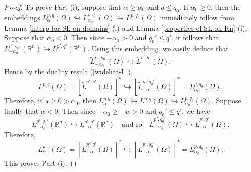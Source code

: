 \documentclass[10pt,a4paper]{amsart}
\newcommand{\R}{{\mathbb{R}}}
\begin{document}
\begin{proof} To prove Part (i), suppose that $\alpha  \ge \alpha_0$  and $q \le q_0 $. If $\alpha_0 \ge 0$, then the embeddings   $ L_\alpha^{p,q}(\Omega )  \hookrightarrow    L_{\alpha_0}^{p,q_0 }(\Omega )\hookrightarrow    L^{p,q_0 }(\Omega )$  immediately follow    from Lemma \ref{interp for SL on domains} (i) and Lemma \ref{properties of SL on Rn} (i).
Suppose that $\alpha_0 < 0$. Then since $-\alpha_0 >  0$ and $q_0 '\le q'$, it follows that  $ L_{-\alpha_0}^{p',q_0'}(\R^n )  \hookrightarrow    L^{p',q '}(\R^n ) $. Using this embedding, we easily deduce that
$$
\widetilde{L}_{-\alpha_0}^{p',q_0 '}(\Omega )     \hookrightarrow  \widetilde{L}^{p',q'}(\Omega ).
$$
Hence by the duality result  (\ref{widehat-L}),
\[
L^{p,q}(\Omega )  = \left[ \widetilde{L}^{p',q'}(\Omega ) \right]^* \hookrightarrow \left[ \widetilde{L}_{-\alpha_0}^{p',q_0 '}(\Omega ) \right]^* = L_{\alpha_0}^{p,q_0 }(\Omega )   .
\]
Therefore, if $\alpha \ge 0 > \alpha_0$, then
$L_{\alpha}^{p,q  }(\Omega ) \hookrightarrow  L^{p,q}(\Omega )   \hookrightarrow L_{\alpha_0}^{p,q_0 }(\Omega )$.
Suppose finally that $\alpha < 0$.  Then since $-\alpha_0 \ge -\alpha > 0$ and $q_0 '\le q'$, we have
$$
L_{-\alpha_0}^{p',q_0'}(\R^n )  \hookrightarrow    L_{-\alpha}^{p',q '}(\R^n )
\quad\mbox{and so}\quad
\widetilde{L}_{-\alpha_0}^{p',q_0 '}(\Omega )  \hookrightarrow  \widetilde{L}_{-\alpha}^{p',q  '}(\Omega )   .
$$
Therefore,
\[
L_\alpha^{p,q}(\Omega )  = \left[ \widetilde{L}_{-\alpha}^{p',q'}(\Omega ) \right]^* \hookrightarrow \left[ \widetilde{L}_{-\alpha_0}^{p',q_0 '}(\Omega ) \right]^* = L_{\alpha_0}^{p,q_0 }(\Omega )  .
\]
This proves Part (i).


\end{proof}
\end{document}
